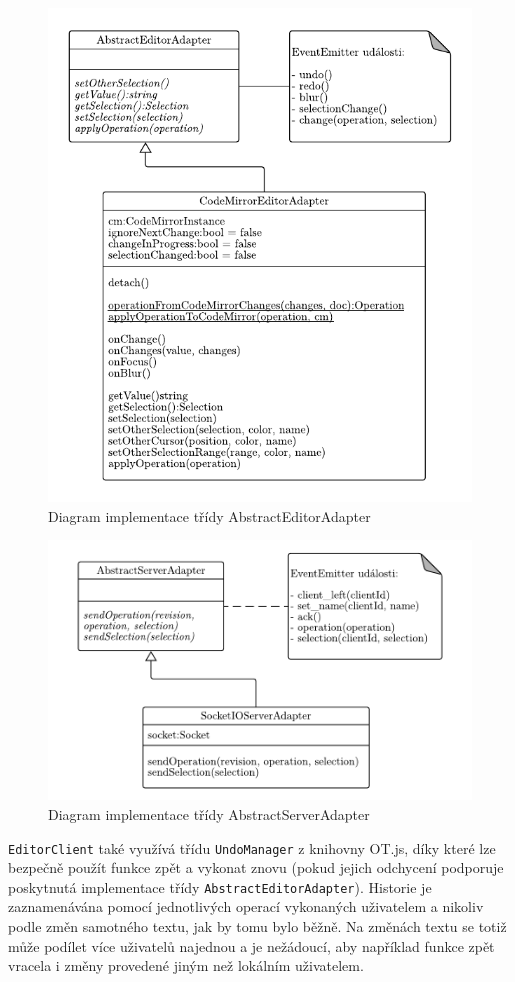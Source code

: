 \begin{figure}[ht!]
    \centering
    \includegraphics[width=.8\textwidth]{partials/navrh/editor/AbstractEditorAdapter.pdf}
    \caption{Diagram implementace třídy AbstractEditorAdapter}\label{fig:AbstractEditorAdapter}
\end{figure}

\begin{figure}[ht!]
    \centering
    \includegraphics[width=.8\textwidth]{partials/navrh/editor/AbstractServerAdapter.pdf}
    \caption{Diagram implementace třídy AbstractServerAdapter}\label{fig:AbstractServerAdapter}
\end{figure}

\texttt{EditorClient} také využívá třídu \texttt{UndoManager} z knihovny OT.js, díky které lze bezpečně použít funkce zpět a vykonat znovu (pokud jejich odchycení podporuje poskytnutá implementace třídy \texttt{AbstractEditorAdapter}).
Historie je zaznamenávána pomocí jednotlivých operací vykonaných uživatelem a nikoliv podle změn samotného textu, jak by tomu bylo běžně.
Na změnách textu se totiž může podílet více uživatelů najednou a je nežádoucí, aby například funkce zpět vracela i změny provedené jiným než lokálním uživatelem.


